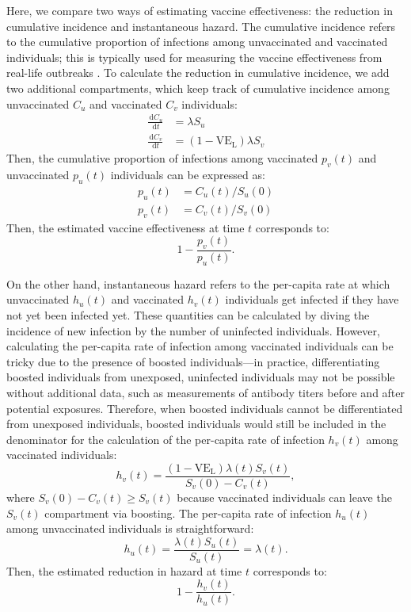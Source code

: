 \documentclass[12pt]{article}
\newcommand{\dd}[1]{\ensuremath{\, \mathrm{d}#1}}
\newcommand{\VE}{\ensuremath{\mathrm{VE}}}
\newcommand{\VEL}{\ensuremath{\VE_{\mathrm{L}}}}
\begin{document}
Here, we compare two ways of estimating vaccine effectiveness: the reduction in cumulative incidence and instantaneous hazard.
The cumulative incidence refers to the cumulative proportion of infections among unvaccinated and vaccinated individuals; 
this is typically used for measuring the vaccine effectiveness from real-life outbreaks \citep{farrington1993estimation}.
To calculate the reduction in cumulative incidence, we add two additional compartments, which keep track of cumulative incidence among unvaccinated $C_u$ and vaccinated $C_v$ individuals:
\begin{align}
\frac{\dd C_u}{\dd t} &= \lambda S_u\\
\frac{\dd C_v}{\dd t} &= (1-\VEL) \lambda S_v
\end{align}
Then, the cumulative proportion of infections among vaccinated $p_v(t)$ and unvaccinated $p_u(t)$ individuals can be expressed as:
\begin{align}
p_u(t) &= C_u(t)/S_u(0)\\
p_v(t) &= C_v(t)/S_v(0)
\end{align}
Then, the estimated vaccine effectiveness at time $t$ corresponds to:
\begin{equation}
1 - \frac{p_v(t)}{p_u(t)}.
\end{equation}

On the other hand, instantaneous hazard refers to the per-capita rate at which unvaccinated $h_u(t)$ and vaccinated $h_v(t)$ individuals get infected if they have not yet been infected yet.
These quantities can be calculated by diving the incidence of new infection by the number of uninfected individuals.
However, calculating the per-capita rate of infection among vaccinated individuals can be tricky due to the presence of boosted individuals---in practice, differentiating boosted individuals from unexposed, uninfected individuals may not be possible without additional data, such as measurements of antibody titers before and after potential exposures.
Therefore, when boosted individuals cannot be differentiated from unexposed individuals, boosted individuals would still be included in the denominator for the calculation of the per-capita rate of infection $h_v(t)$ among vaccinated individuals:
\begin{equation}
h_v(t) = \frac{(1-\VEL) \lambda(t) S_v(t)}{S_v(0) - C_v(t)},
\end{equation}
where $S_v(0) - C_v(t) \geq S_v(t)$ because vaccinated individuals can leave the $S_v(t)$ compartment via boosting.
The per-capita rate of infection $h_u(t)$ among unvaccinated individuals is straightforward: 
\begin{equation}
h_u(t) = \frac{\lambda(t) S_u(t)}{S_u(t)} = \lambda(t).
\end{equation}
Then, the estimated reduction in hazard at time $t$ corresponds to:
\begin{equation}
1 - \frac{h_v(t)}{h_u(t)}.
\end{equation}
\end{document}
